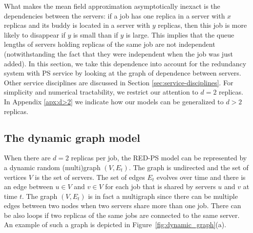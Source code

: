 \documentclass[acmsmall,nonacm]{acmart}
\begin{document}
What makes the mean field approximation asymptotically inexact is the dependencies between the servers: if a job has one replica in a server with $x$ replicas and its buddy is located in a server with $y$ replicas, then this job is more likely to disappear if $y$ is small than if $y$ is large. This implies that the queue lengths of servers holding replicas of the same job are not independent
(notwithstanding the fact that they were independent when the job was just added).  In this section, we take this dependence into account for the redundancy system with PS service by looking at the graph of dependence between servers.  
Other service disciplines are discussed in Section \ref{sec:service-disciplines}. For simplicity and numerical tractability, we restrict our attention to $d=2$ replicas. 
In Appendix \ref{apx:d>2} we indicate how our models can be generalized to $d > 2$ replicas.

\subsection{The dynamic graph model}

When there are $d=2$ replicas per job, the RED-PS model can be represented by a dynamic random (multi)graph $(V, E_t)$. The graph is undirected and the set of vertices $V$ is the set of servers. The set of edges $E_t$ evolves over time and there is an edge between $u \in V$ and $v \in V$ for each job that is shared by servers $u$ and $v$ at time $t$.  The graph $(V,E_t)$ is in fact a multigraph since there can be multiple edges between two nodes when two servers share more than one job. There can be also loops if two replicas of the same jobs are connected to the same server.  An example of such a graph is depicted in Figure~\ref{fig:dynamic_graph}(a). 
\end{document}
